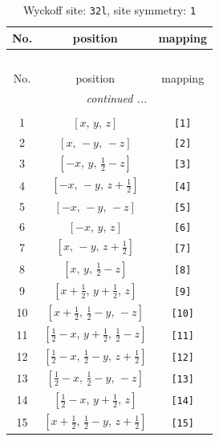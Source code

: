 \documentclass[fleqn,8pt]{jsarticle}
\begin{document}
\renewcommand{\arraystretch}{1.2}
\begin{longtable}{ccc}
\caption{Wyckoff site: {\tt 32l}, site symmetry: {\tt 1}}
 \\
 \hline \hline
No. & position & mapping \\ \hline \endfirsthead

\multicolumn{2}{l}{\tablename\ \thetable{}} \\
 \hline \hline
No. & position & mapping \\ \hline \endhead

 \hline \hline
\multicolumn{2}{r}{\footnotesize\it continued ...} \\ \endfoot

 \hline \hline
\multicolumn{2}{r}{} \\ \endlastfoot

1 & $\left[ x,\, y,\, z \right]$ & {\tt [1]} \\ \hline
2 & $\left[ x,\, - y,\, - z \right]$ & {\tt [2]} \\ \hline
3 & $\left[ - x,\, y,\, \frac{1}{2} - z \right]$ & {\tt [3]} \\ \hline
4 & $\left[ - x,\, - y,\, z + \frac{1}{2} \right]$ & {\tt [4]} \\ \hline
5 & $\left[ - x,\, - y,\, - z \right]$ & {\tt [5]} \\ \hline
6 & $\left[ - x,\, y,\, z \right]$ & {\tt [6]} \\ \hline
7 & $\left[ x,\, - y,\, z + \frac{1}{2} \right]$ & {\tt [7]} \\ \hline
8 & $\left[ x,\, y,\, \frac{1}{2} - z \right]$ & {\tt [8]} \\ \hline
9 & $\left[ x + \frac{1}{2},\, y + \frac{1}{2},\, z \right]$ & {\tt [9]} \\ \hline
10 & $\left[ x + \frac{1}{2},\, \frac{1}{2} - y,\, - z \right]$ & {\tt [10]} \\ \hline
11 & $\left[ \frac{1}{2} - x,\, y + \frac{1}{2},\, \frac{1}{2} - z \right]$ & {\tt [11]} \\ \hline
12 & $\left[ \frac{1}{2} - x,\, \frac{1}{2} - y,\, z + \frac{1}{2} \right]$ & {\tt [12]} \\ \hline
13 & $\left[ \frac{1}{2} - x,\, \frac{1}{2} - y,\, - z \right]$ & {\tt [13]} \\ \hline
14 & $\left[ \frac{1}{2} - x,\, y + \frac{1}{2},\, z \right]$ & {\tt [14]} \\ \hline
15 & $\left[ x + \frac{1}{2},\, \frac{1}{2} - y,\, z + \frac{1}{2} \right]$ & {\tt [15]} \\ \hline

\end{longtable}
\end{document}
